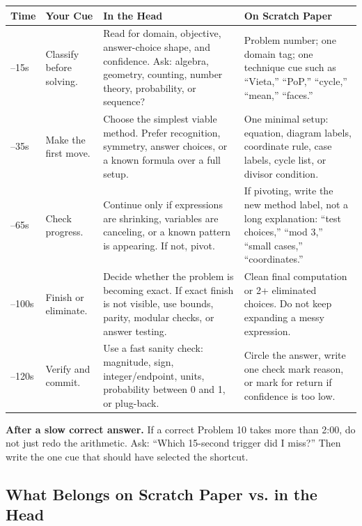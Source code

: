 \documentclass[11pt]{article}
\begin{document}
\begin{longtable}{@{}>{\raggedright\arraybackslash}p{} >{\raggedright\arraybackslash}p{} >{\raggedright\arraybackslash}p{} >{\raggedright\arraybackslash}p{}@{}}
\textbf{Time} & \textbf{Your Cue} & \textbf{In the Head} & \textbf{On Scratch Paper}\\
\hline
0--15s & Classify before solving. & Read for domain, objective, answer-choice shape, and confidence. Ask: algebra, geometry, counting, number theory, probability, or sequence? & Problem number; one domain tag; one technique cue such as ``Vieta,'' ``PoP,'' ``cycle,'' ``mean,'' ``faces.''\\
15--35s & Make the first move. & Choose the simplest viable method. Prefer recognition, symmetry, answer choices, or a known formula over a full setup. & One minimal setup: equation, diagram labels, coordinate rule, case labels, cycle list, or divisor condition.\\
35--65s & Check progress. & Continue only if expressions are shrinking, variables are canceling, or a known pattern is appearing. If not, pivot. & If pivoting, write the new method label, not a long explanation: ``test choices,'' ``mod 3,'' ``small cases,'' ``coordinates.''\\
65--100s & Finish or eliminate. & Decide whether the problem is becoming exact. If exact finish is not visible, use bounds, parity, modular checks, or answer testing. & Clean final computation or 2+ eliminated choices. Do not keep expanding a messy expression.\\
100--120s & Verify and commit. & Use a fast sanity check: magnitude, sign, integer/endpoint, units, probability between 0 and 1, or plug-back. & Circle the answer, write one check mark reason, or mark for return if confidence is too low.\\
\end{longtable}

\textbf{After a slow correct answer.} If a correct Problem 10 takes more than 2:00, do not just redo the arithmetic. Ask: ``Which 15-second trigger did I miss?'' Then write the one cue that should have selected the shortcut.

\subsection{What Belongs on Scratch Paper vs. in the Head}
\end{document}
